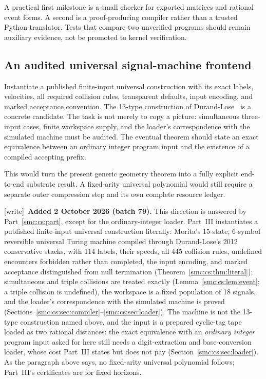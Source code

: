 \documentclass[11pt,letterpaper]{article}
\numberwithin{equation}{section}
\theoremstyle{definition}
\theoremstyle{remark}
\newcommand{\wtag}{\textup{[write]}}
\begin{document}
A practical first milestone is a small checker for exported matrices and
rational event forms. A second is a proof-producing compiler rather than a
trusted Python translator. Tests that compare two unverified programs should
remain auxiliary evidence, not be promoted to kernel verification.

\subsection{An audited universal signal-machine frontend}\label{smc:cg:q:universal}

Instantiate a published finite-input universal construction with its exact
labels, velocities, all required collision rules, transparent defaults, input
encoding, and marked acceptance convention. The 13-type construction of
Durand-Lose~\cite{durandlose} is a concrete candidate. The task is not merely
to copy a picture: simultaneous three-input cases, finite workspace supply,
and the loader's correspondence with the simulated machine must be audited.
The eventual theorem should state an exact equivalence between an ordinary
integer program input and the existence of a compiled accepting prefix.

This would turn the present generic geometry theorem into a fully explicit
end-to-end substrate result. A fixed-arity universal polynomial would still
require a separate outer compression step and its own complete resource
ledger.

\wtag\ \textbf{Added 2 October 2026 (batch 79).} This direction is answered by Part~\ref{smc:cs:part}, except for the ordinary-integer loader. Part~III instantiates a published finite-input universal construction literally: Morita's 15-state, 6-symbol reversible universal Turing machine compiled through Durand-Lose's 2012 conservative stacks, with 114 labels, their speeds, all 445 collision rules, undefined encounters forbidden rather than completed, the input encoding, and marked acceptance distinguished from null termination (Theorem~\ref{smc:cs:thm:literal}); simultaneous and triple collisions are treated exactly (Lemma~\ref{smc:cs:lem:event}; a triple collision is undefined), the workspace is a fixed population of 18 signals, and the loader's correspondence with the simulated machine is proved (Sections~\ref{smc:cs:sec:compiler}--\ref{smc:cs:sec:loader}). The machine is not the 13-type construction named above, and the input is a prepared cyclic-tag tape loaded as two rational distances: the exact equivalence with an \emph{ordinary integer} program input asked for here still needs a digit-extraction and base-conversion loader, whose cost Part~III states but does not pay (Section~\ref{smc:cs:sec:loader}). As the paragraph above says, no fixed-arity universal polynomial follows; Part~III's certificates are for fixed horizons.
\end{document}
